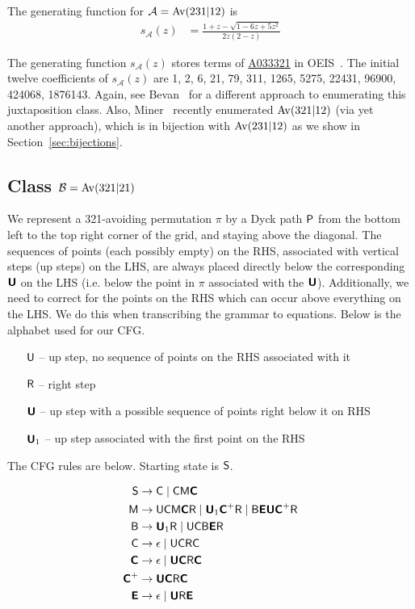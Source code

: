 \documentclass[12pt, a4paper, twoside]{report}
\begin{document}
\begin{theorem}
The generating function for $\mathcal{A} = \mathrm{Av}(231|12)$ is 
\begin{align*}
s_{\mathcal{A}}(z)
&= \frac{1+z-\sqrt{1-6z+5z^2}}{2z(2-z)}
\end{align*}
\end{theorem}

The generating function $s_{\mathcal{A}}(z)$ stores terms of \href{http://oeis.org/A033321}{A033321} in OEIS~\cite{oeis}. The initial twelve coefficients of $s_{\mathcal{A}}(z)$ are 1, 2, 6, 21, 79, 311, 1265, 5275, 22431, 96900, 424068, 1876143. Again, see Bevan~\cite{bevan-new} for a different approach to enumerating this juxtaposition class. Also, Miner~\cite{miner16twobyfour} recently enumerated $\mathrm{Av}(321|12)$ (via yet another approach), which is in bijection with $\mathrm{Av}(231|12)$ as we show in Section~\ref{sec:bijections}.


\subsection{Class $\mathcal{B} = \mathrm{Av}(321|21)$}
\label{sec:catalanjuxt_av321av21}
We represent a 321-avoiding permutation $\pi$ by a Dyck path $\textsf{P}$ from the bottom left to the top right corner of the grid, and staying above the diagonal. The sequences of points (each possibly empty) on the RHS, associated with vertical steps (up steps) on the LHS, are always placed directly below the corresponding $\textbf{\textsf{U}}$ on the LHS (i.e. below the point in $\pi$ associated with the $\textbf{\textsf{U}}$). Additionally, we need to correct for the points on the RHS which can occur above everything on the LHS. We do this when transcribing the grammar to equations. Below is the alphabet used for our CFG.

\begin{enumerate}
\item[$\mathsf{U}$ --] up step, no sequence of points on the RHS associated with it
\item[$\mathsf{R}$ --] right step
\item[$\textbf{\textsf{U}}$ --] up step with a possible sequence of points right below it on RHS
\item[$\textbf{\textsf{U}}_1$ --] up step associated with the first point on the RHS 
\end{enumerate}

\noindent The CFG rules are below. Starting state is $\mathsf{S}$.

\begin{align*}
\mathsf{S} &\to \mathsf{C} \mid \mathsf{C}\mathsf{M}\textbf{\textsf{C}}\\
\mathsf{M} &\to \mathsf{U}\mathsf{C}\mathsf{M}\textbf{\textsf{C}}\mathsf{R} \mid \textbf{\textsf{U}}_1\textbf{\textsf{C}}^+\mathsf{R} \mid \mathsf{B}\textbf{\textsf{E}}\textbf{\textsf{U}}\textbf{\textsf{C}}^+\mathsf{R}\\
\mathsf{B} &\to \textbf{\textsf{U}}_1\mathsf{R} \mid \mathsf{U}\mathsf{C}\mathsf{B}\textbf{\textsf{E}}\mathsf{R}\\
\mathsf{C} &\to \epsilon \mid \mathsf{U}\mathsf{C}\mathsf{R}\mathsf{C}\\
\textbf{\textsf{C}} &\to \epsilon \mid \textbf{\textsf{U}}\textbf{\textsf{C}}\mathsf{R}\textbf{\textsf{C}}\\
\textbf{\textsf{C}}^+ &\to \textbf{\textsf{U}}\textbf{\textsf{C}}\mathsf{R}\textbf{\textsf{C}}\\
\textbf{\textsf{E}} &\to \epsilon \mid \textbf{\textsf{U}}\mathsf{R}\textbf{\textsf{E}}
\end{align*}
\end{document}
